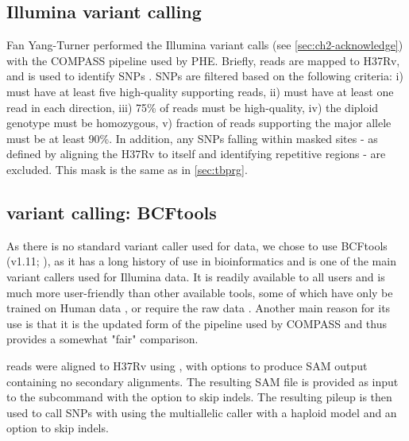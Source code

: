 \subsection{Illumina variant calling}
\label{sec:illumina-var-call}

Fan Yang-Turner performed the Illumina variant calls (see \autoref{sec:ch2-acknowledge}) with the COMPASS pipeline used by PHE. Briefly, reads are mapped to H37Rv, and  is used to identify SNPs \cite{samtools2009}. SNPs are filtered based on the following criteria: i) must have at least five high-quality supporting reads, ii) must have at least one read in each direction, iii) 75\% of reads must be high-quality, iv) the diploid genotype must be homozygous, v) fraction of reads supporting the major allele must be at least 90\%. In addition, any SNPs falling within masked sites - as defined by aligning the H37Rv to itself and identifying repetitive regions \cite{tbmask2014} - are excluded. This mask is the same as in \autoref{sec:tbprg}.

\subsection{\ont{} variant calling: BCFtools}
\label{sec:bcftools-filters}

As there is no standard variant caller used for \mtb{} \ont{} data, we chose to use BCFtools (v1.11; \cite{bcftools2021}), as it has a long history of use in bioinformatics and is one of the main variant callers used for Illumina data. It is readily available to all users and is much more user-friendly than other available tools, some of which have only be trained on Human data \cite{clair2020}, or require the raw \ont{} data \cite{nanopolish2015}. Another main reason for its use is that it is the updated form of the  pipeline used by COMPASS and thus provides a somewhat "fair" comparison.

\ont{} reads were aligned to H37Rv using , with options to produce SAM output containing no secondary alignments. The resulting SAM file is provided as input to the \bcftools{} subcommand  with the option to skip indels. The resulting pileup is then used to call SNPs with  using the multiallelic caller with a haploid model and an option to skip indels.

